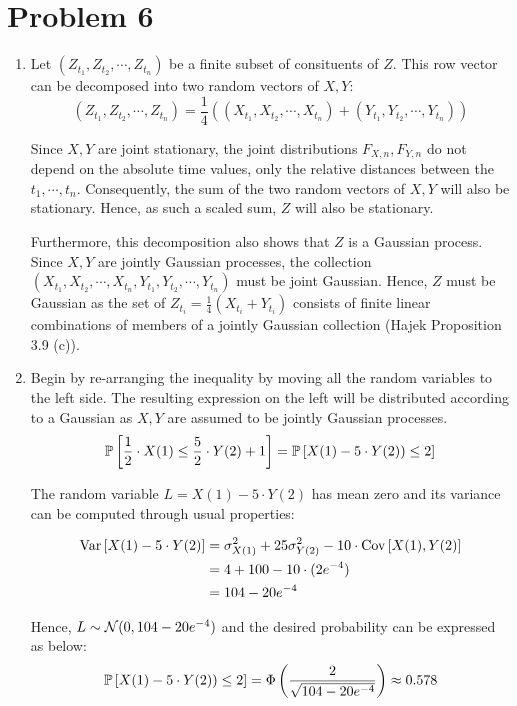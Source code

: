 \documentclass[12pt]{article}%
\begin{document}
\section{Problem 6}
\begin{enumerate}
  \item Let $(Z_{t_{1}},Z_{{t_{2}}},\cdots, Z_{{t_{n}}})$ be a finite subset of consituents of $Z$. This row vector can be decomposed into two random vectors of $X,Y$:
        \[(Z_{t_{1}},Z_{{t_{2}}},\cdots, Z_{{t_{n}}}) = \frac{1}{4}((X_{t_{1}},X_{{t_{2}}},\cdots, X_{{t_{n}}}) + (Y_{t_{1}},Y_{{t_{2}}},\cdots, Y_{t_{n}})) \]

        Since $X,Y$ are joint stationary, the joint distributions $F_{X,n},F_{Y,n}$ do not depend on the absolute time values, only the relative distances between the $t_{1},\cdots, t_{n}$. Consequently, the sum of the two random vectors of $X,Y$ will also be stationary. Hence, as such a scaled sum, $Z$ will also be stationary.

        Furthermore, this decomposition also shows that $Z$ is a Gaussian process. Since $X,Y$ are jointly Gaussian processes, the collection $(X_{t_{1}},X_{{t_{2}}},\cdots, X_{t_{n}}, Y_{t_{1}},Y_{t_{2}},\cdots, Y_{t_{n}})$ must be joint Gaussian. Hence, $Z$ must be Gaussian as the set of $Z_{{t_{i}}} = \frac{1}{4}(X_{{t_{i}}} + Y_{{t_{i}}})$ consists of finite linear combinations of members of a jointly Gaussian collection (Hajek Proposition 3.9 (c)).

  \item Begin by re-arranging the inequality by moving all the random variables to the left side. The resulting expression on the left will be distributed according to a Gaussian as $X,Y$ are assumed to be jointly Gaussian processes.
        \[\mathbb{P}\left[\frac{1}{2}\cdot X(1) \leq \frac{5}{2} \cdot Y(2) + 1\right] = \mathbb{P}\left[X(1) - 5\cdot Y(2)) \leq 2\right]\]

        The random variable $L = X(1) - 5\cdot Y(2)$ has mean zero and its variance can be computed through usual properties:

        \begin{align*}
          \text{Var}\left[X(1) - 5\cdot Y(2)\right] & = \sigma_{X(1)}^{2} + 25 \sigma_{{Y(2)}}^{2} - 10\cdot\text{Cov}\left[X(1),Y(2)\right] \\
                                   & = 4 + 100 - 10\cdot(2e^{-4}) \\
          & = 104 - 20e^{{-4}}
        \end{align*}

        Hence, $L \sim \mathcal{N}(0,104 - 20e^{{-4}})$ and the desired probability can be expressed as below:
        \[ \mathbb{P}\left[X(1) - 5\cdot Y(2)) \leq 2\right] = \Phi\left(\frac{2}{\sqrt{104 - 20 e^{{-4}}}}\right) \approx 0.578\]
\end{enumerate}
\end{document}
